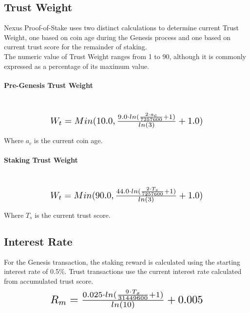 \documentclass[11pt]{article}
\begin{document}
\subsection{Trust Weight}
\noindent Nexus Proof-of-Stake uses two distinct calculations to determine current Trust Weight, one based on coin age during the Genesis process and one based on current trust score for the remainder of staking.\\

\noindent The numeric value of Trust Weight ranges from 1 to 90, although it is commonly expressed as a percentage of its maximum value.\\

\paragraph{Pre-Genesis Trust Weight} ~\\
\begin{equation}
\resizebox{.65\hsize}{!}{$W_{t} = Min(10.0, \frac{9.0 \cdot ln(\frac{2 \cdot a_c}{7257600} + 1)}{ln(3)} + 1.0)$}
\end{equation}

\noindent Where $a_c$ is the current coin age.\\

\paragraph{Staking Trust Weight} ~\\
\begin{equation}
\resizebox{.65\hsize}{!}{$W_{t} = Min(90.0, \frac{44.0 \cdot ln(\frac{2 \cdot T_{s}}{7257600} + 1)}{ln(3)} + 1.0)$}
\end{equation}

\noindent Where $T_{s}$ is the current trust score.\\


\subsection{Interest Rate}
\noindent For the Genesis transaction, the staking reward is calculated using the starting interest rate of 0.5\%. Trust transactions use the current interest rate calculated from accumulated trust score.\\
 
\begin{equation}
\resizebox{.65\hsize}{!}{$R_{m} = \frac{0.025 \cdot ln(\frac{9 \cdot T_{s}}{31449600} + 1)}{ln(10)} + 0.005$}
\end{equation}
\end{document}
